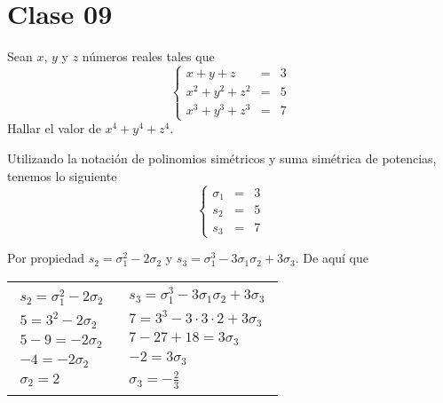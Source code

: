 \section{Clase 09}

\begin{section-problem}
    Sean $x$, $y$ y $z$ números reales tales que
    \[
        \left\{
        \begin{array}{rcl}
            x + y + z & =& 3\\
            x^2 + y^2 + z^2 & =& 5\\
            x^3 + y^3 + z^3 & =& 7
        \end{array}
        \right.
    \]
    Hallar el valor de $x^4 + y^4 + z^4$.
\end{section-problem}

\begin{solution}
    Utilizando la notación de polinomios simétricos y suma simétrica de potencias, tenemos lo siguiente
    \[
        \left\{
        \begin{array}{rcl}
            \sigma_1 & =& 3\\
            s_2 & =& 5\\
            s_3 & =& 7
        \end{array}
        \right.
    \]

    Por propiedad $s_2 = \sigma_1^2 - 2\sigma_2$ y $s_3 = \sigma_1^3 - 3\sigma_1 \sigma_2 + 3\sigma_3$.
    De aquí que
    \vspace{-10mm}
    \begin{table}[H]
        \centering
        \begin{tabular}{p{5cm} p{5cm}}
            \begin{gather*}
                s_2 = \sigma_1^2 - 2\sigma_2\\
                5 = 3^2 - 2\sigma_2\\
                5 - 9 = - 2\sigma_2\\
                - 4 = - 2\sigma_2\\
                \boxed{\sigma_2 = 2}
            \end{gather*}
            &
            \begin{gather*}
                s_3 = \sigma_1^3 - 3\sigma_1 \sigma_2 + 3\sigma_3\\
                7 = 3^3 - 3\cdot 3\cdot 2 + 3\sigma_3\\
                7 - 27 + 18 = 3\sigma_3\\
                -2 = 3\sigma_3\\
                \boxed{\sigma_3 = - \frac{2}{3}}
            \end{gather*}
        \end{tabular}
    \end{table}
    \vspace{-10mm}


\end{solution}
